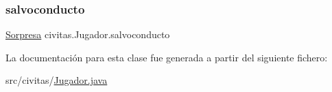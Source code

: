 \mbox{\label{classcivitas_1_1Jugador_ad5cc928f36c930703bec36ee0be85132}} 
\subsubsection{\texorpdfstring{salvoconducto}{salvoconducto}}
{\footnotesize\ttfamily \hyperlink{classcivitas_1_1Sorpresa}{Sorpresa} civitas.\+Jugador.\+salvoconducto\hspace{0.3cm}{\ttfamily [private]}}



La documentación para esta clase fue generada a partir del siguiente fichero\+:\begin{DoxyCompactItemize}
\item 
src/civitas/\hyperlink{Jugador_8java}{Jugador.\+java}\end{DoxyCompactItemize}
